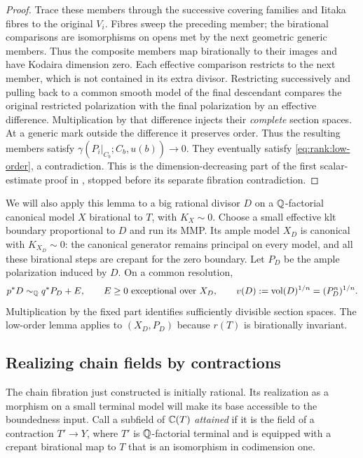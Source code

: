 \begin{proof}
Trace these members through the successive covering families and
Iitaka fibres to the original $V_i$.  Fibres sweep the preceding member;
the birational comparisons are isomorphisms on opens met by the next
geometric generic members.  Thus the composite members map birationally
to their images and have Kodaira dimension zero.  Each effective
comparison restricts to the next member, which is not contained in its
extra divisor.  Restricting successively and pulling back to a common
smooth model of the final descendant compares the original restricted
polarization with the final polarization by an effective difference.
Multiplication by that difference injects their \emph{complete} section
spaces.  At a generic mark outside the difference it preserves order.
Thus the resulting members satisfy
$\gamma(P_i|_{C_b};C_b,u(b))\to0$.  They eventually satisfy
\eqref{eq:rank:low-order}, a contradiction.  This is the
dimension-decreasing part of the first scalar-estimate proof in
\cite{UPI}, stopped before its separate fibration contradiction.
\end{proof}

We will also apply this lemma to a big rational divisor $D$ on a
$\mathbb Q$-factorial canonical model $X$ birational to $T$, with $K_X\sim0$.
Choose a small effective klt boundary proportional to $D$ and run its
MMP.  Its ample model $X_D$ is canonical with $K_{X_D}\sim0$: the
canonical generator remains principal on every model, and all these
birational steps are crepant for the zero boundary.  Let $P_D$ be the
ample polarization induced by $D$.  On a common resolution,
\begin{equation}\label{eq:rank:ample-model}
 p^*D\sim_{\mathbb Q}q^*P_D+E,
 \qquad E\ge0\text{ exceptional over }X_D,
 \qquad v(D):=\operatorname{vol}(D)^{1/n}=(P_D^n)^{1/n}.
\end{equation}
Multiplication by the fixed part identifies sufficiently divisible
section spaces.  The low-order lemma applies to $(X_D,P_D)$ because
$r(T)$ is birationally invariant.

\subsection{Realizing chain fields by contractions}

The chain fibration just constructed is initially rational.  Its
realization as a morphism on a small terminal model will make its base
accessible to the boundedness input.  Call a subfield of $\mathbb C(T)$
\emph{attained} if it is the field of a contraction $T'\to Y$, where
$T'$ is $\mathbb Q$-factorial terminal and is equipped with a crepant birational
map to $T$ that is an isomorphism in codimension one.


